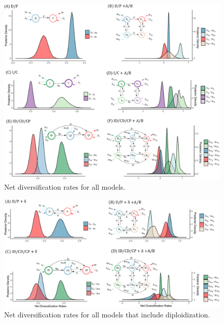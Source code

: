 %


\begin{figure}
\includegraphics[width=\textwidth]{allnetdivmodelswithoutdelta.pdf} %
\caption{Net diversification rates for all models.}  
\label{figure:netdivall}
\end{figure}

\begin{figure}
\includegraphics[width=\textwidth]{allnetdivmodelsdiploidization.pdf} %
\caption{Net diversification rates for all models that include diploidization.}  
\label{figure:netdivnodip}
\end{figure}

